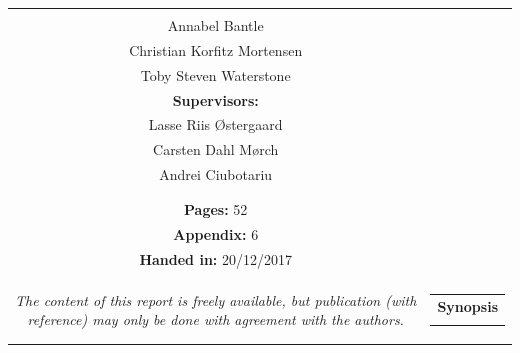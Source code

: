 \begin{titlepage}
\begin{nopagebreak}
{\begin{tabular}{cc}
{{\textbf{Participants:}\\
Annabel Bantle \\
Christian Korfitz Mortensen\\
Toby Steven Waterstone\\



\textbf{Supervisors:}\\
Lasse Riis Østergaard\\
Carsten Dahl Mørch\\
Andrei Ciubotariu
}\\
\\
\\
\textbf{Pages:} 52\\
\textbf{Appendix:} 6 \\
\textbf{Handed in:} 20/12/2017\\
\\
\textit{The content of this report is freely available, but publication (with reference) may only be done with
	agreement with the authors.}
\vfill } &
\parbox{7cm}{
  \vspace{.15cm}
  \hfill
  \begin{tabular}{l}
  {\textbf{Synopsis}}\bigskip \\
  \fbox{
    \parbox{6.5cm}{\bigskip
     {\vfill{\small 
     \bigskip}}
     }}
   \end{tabular}}
\end{tabular}} %



\end{nopagebreak}
\end{titlepage}
%